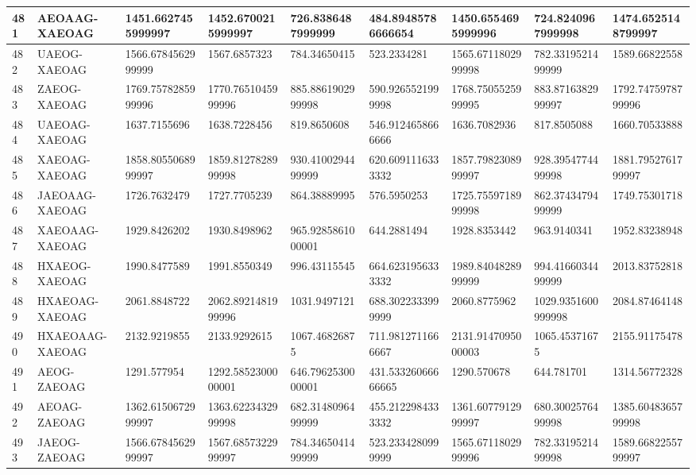 {\begin{longtable}{|l|l|l|l|l|l|l|l|l|}
        481 & AEOAAG-XAEOAG & 1451.6627455999997 & 1452.6700215999997 & 726.8386487999999 & 484.89485786666654 & 1450.6554695999996 & 724.8240967999998 & 1474.6525148799997 \\ \hline
        482 & UAEOG-XAEOAG & 1566.6784562999999 & 1567.6857323 & 784.34650415 & 523.2334281 & 1565.6711802999998 & 782.3319521499999 & 1589.66822558 \\ \hline
        483 & ZAEOG-XAEOAG & 1769.7578285999996 & 1770.7651045999996 & 885.8861902999998 & 590.9265521999998 & 1768.7505525999995 & 883.8716382999997 & 1792.7475978799996 \\ \hline
        484 & UAEOAG-XAEOAG & 1637.7155696 & 1638.7228456 & 819.8650608 & 546.9124658666666 & 1636.7082936 & 817.8505088 & 1660.70533888 \\ \hline
        485 & XAEOAG-XAEOAG & 1858.8055068999997 & 1859.8127828999998 & 930.4100294499999 & 620.6091116333332 & 1857.7982308999997 & 928.3954774499998 & 1881.7952761799997 \\ \hline
        486 & JAEOAAG-XAEOAG & 1726.7632479 & 1727.7705239 & 864.38889995 & 576.5950253 & 1725.7559718999998 & 862.3743479499999 & 1749.75301718 \\ \hline
        487 & XAEOAAG-XAEOAG & 1929.8426202 & 1930.8498962 & 965.9285861000001 & 644.2881494 & 1928.8353442 & 963.9140341 & 1952.83238948 \\ \hline
        488 & HXAEOG-XAEOAG & 1990.8477589 & 1991.8550349 & 996.43115545 & 664.6231956333332 & 1989.8404828999999 & 994.4166034499999 & 2013.83752818 \\ \hline
        489 & HXAEOAG-XAEOAG & 2061.8848722 & 2062.8921481999996 & 1031.9497121 & 688.3022333999999 & 2060.8775962 & 1029.9351600999998 & 2084.87464148 \\ \hline
        490 & HXAEOAAG-XAEOAG & 2132.9219855 & 2133.9292615 & 1067.46826875 & 711.9812711666667 & 2131.9147095000003 & 1065.45371675 & 2155.91175478 \\ \hline
        491 & AEOG-ZAEOAG & 1291.577954 & 1292.5852300000001 & 646.7962530000001 & 431.53326066666665 & 1290.570678 & 644.781701 & 1314.56772328 \\ \hline
        492 & AEOAG-ZAEOAG & 1362.6150672999997 & 1363.6223432999998 & 682.3148096499999 & 455.2122984333332 & 1361.6077912999997 & 680.3002576499998 & 1385.6048365799998 \\ \hline
        493 & JAEOG-ZAEOAG & 1566.6784562999997 & 1567.6857322999997 & 784.3465041499999 & 523.2334280999999 & 1565.6711802999996 & 782.3319521499998 & 1589.6682255799997 \\ \hline

\end{longtable}}
